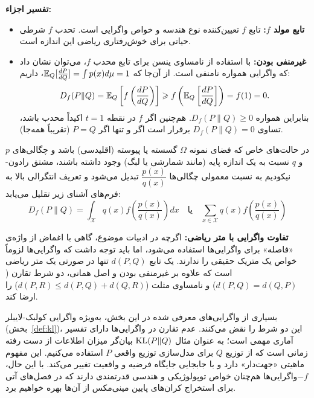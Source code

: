 \textbf{تفسیر اجزاء:}
\begin{itemize}
    \item \textbf{تابع مولد $f$:} تابع $f$ تعیین‌کننده نوع هندسه و خواص واگرایی است. تحدب $f$ شرطی حیاتی برای خوش‌رفتاری ریاضی این اندازه است.
    \item \textbf{غیرمنفی بودن:} با استفاده از نامساوی ینسن برای تابع محدب $f$، می‌توان نشان داد که واگرایی همواره نامنفی است. از آن‌جا که $\Eset_Q [\frac{dP}{dQ}] = \int p(x) d\mu = 1$، داریم:
    \begin{equation}
    D_f(P \| Q) = \Eset_Q \left[ f\left( \frac{dP}{dQ} \right) \right] \ge f\left( \Eset_Q \left[ \frac{dP}{dQ} \right] \right) = f(1) = 0.
    \end{equation}
    بنابراین همواره $D_f(P\|Q) \ge 0$. هم‌چنین اگر $f$ در نقطه $t=1$ اکیداً محدب باشد، تساوی $D_f(P\|Q) = 0$ برقرار است اگر و تنها اگر $P=Q$ (تقریباً همه‌جا).
\end{itemize}

در حالت‌های خاص که فضای نمونه $\Omega$ گسسته یا پیوسته (اقلیدسی) باشد و چگالی‌های $p$ و $q$ نسبت به یک اندازه پایه (مانند شمارشی یا لبگ) وجود داشته باشند، مشتق رادون-نیکودیم به نسبت معمولی چگالی‌ها $\dfrac{p(x)}{q(x)}$ تبدیل می‌شود و تعریف انتگرالی بالا به فرم‌های آشنای زیر تقلیل می‌یابد:
\begin{equation}
D_f(P \| Q) = \int_{\mathcal{X}} q(x) f\left( \frac{p(x)}{q(x)} \right) dx \quad \text{یا} \quad \sum_{x \in \mathcal{X}} q(x) f\left( \frac{p(x)}{q(x)} \right)
\end{equation}

\textbf{تفاوت واگرایی با متر ریاضی:}
اگرچه در ادبیات موضوع، گاهی با اغماض از واژه‌ی «فاصله» برای واگرایی‌ها استفاده می‌شود، اما باید توجه داشت که واگرایی‌ها لزوماً خواص یک متریک حقیقی را ندارند. یک تابع $d(P, Q)$ تنها در صورتی یک متر ریاضی است که علاوه بر غیرمنفی بودن و اصل همانی، دو شرط تقارن ($d(P, Q) = d(Q, P)$) و نامساوی مثلث ($d(P, R) \le d(P, Q) + d(Q, R)$) را ارضا کند. 

بسیاری از واگرایی‌های معرفی شده در این بخش، به‌ویژه واگرایی کولبک-لایبلر (بخش~\ref{def:kl})، این دو شرط را نقض می‌کنند. عدم تقارن در واگرایی‌ها دارای تفسیر آماری مهمی است؛ به عنوان مثال $\operatorname*{KL}(P\|Q)$ بیان‌گر میزان اطلاعات از دست رفته زمانی است که از توزیع $Q$ برای مدل‌سازی توزیع واقعی $P$ استفاده می‌کنیم. این مفهوم ماهیتی «جهت‌دار» دارد و با جابجایی جایگاه فرضیه و واقعیت تغییر می‌کند. با این حال، $-f$واگرایی‌ها هم‌چنان خواص توپولوژیکی و هندسی قدرتمندی دارند که در فصل‌های آتی برای استخراج کران‌های پایین مینی‌مکس از آن‌ها بهره خواهیم برد.

